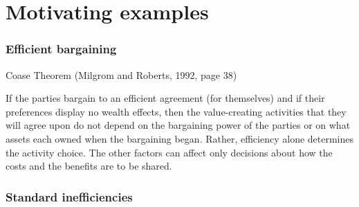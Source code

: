 \documentclass[11pt,english]{beamer}
\begin{document}
\part[lecture 1]{Motivating examples}

\section{Efficient bargaining}

\begin{frame}{Coase Theorem (Milgrom and Roberts,
    1992, page 38)}

If the parties bargain to an efficient agreement
(for themselves) and if their preferences display
no wealth effects, then the value-creating activities
that they will agree upon do not depend on the
bargaining power of the parties or on what assets
each owned when the bargaining began. Rather,
efficiency alone determines the activity choice.
The other factors can affect only decisions about
how the costs and the benefits are to be shared.
\end{frame}

\section{Standard inefficiencies}
\end{document}
